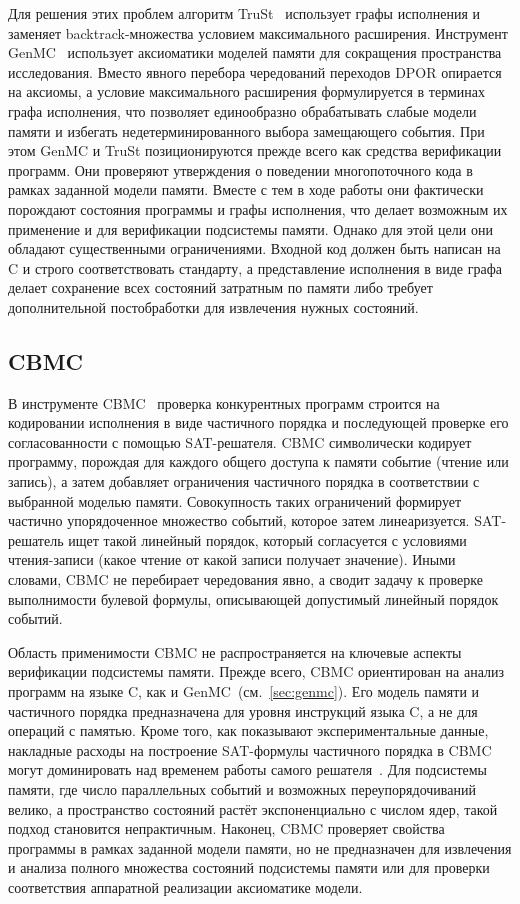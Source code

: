 Для решения этих проблем алгоритм
TruSt~\cite{kokologiannakis2022truly} использует графы исполнения и
заменяет backtrack-множества условием максимального расширения.
Инструмент GenMC~\cite{kokologiannakis2021genmc} использует
аксиоматики моделей памяти для сокращения пространства исследования.
Вместо явного перебора чередований переходов DPOR опирается на
аксиомы, а условие максимального расширения формулируется в терминах
графа исполнения, что позволяет единообразно обрабатывать слабые
модели памяти и избегать недетерминированного выбора замещающего события.
При этом GenMC и TruSt позиционируются прежде всего как средства
верификации программ. Они проверяют утверждения о поведении
многопоточного кода в рамках заданной модели памяти. Вместе с тем в
ходе работы они фактически порождают состояния программы и графы
исполнения, что делает возможным их применение и для верификации
подсистемы памяти. Однако для этой цели они обладают существенными
ограничениями. Входной код должен быть написан на C и строго
соответствовать стандарту, а представление исполнения в виде графа
делает сохранение всех состояний затратным по памяти либо требует
дополнительной постобработки для извлечения нужных состояний.

\subsection{CBMC}
\label{sec:cbmc}

В инструменте CBMC~\cite{alglave2013partial} проверка конкурентных
программ строится на
кодировании исполнения в виде частичного порядка и последующей
проверке его согласованности с помощью SAT-решателя. CBMC
символически кодирует программу, порождая для каждого
общего доступа к памяти событие (чтение или запись), а затем
добавляет ограничения частичного порядка в соответствии с выбранной
моделью памяти.
Совокупность таких ограничений формирует частично упорядоченное
множество событий,
которое затем линеаризуется. SAT-решатель ищет такой линейный порядок,
который согласуется с условиями чтения-записи
(какое чтение от какой записи получает значение). Иными словами,
CBMC не перебирает чередования явно, а сводит задачу к проверке
выполнимости булевой формулы, описывающей допустимый линейный порядок событий.

Область применимости CBMC не распространяется на ключевые аспекты
верификации подсистемы памяти.
Прежде всего, CBMC ориентирован на анализ программ на
языке C, как и GenMC~(см.~\ref{sec:genmc}). Его модель памяти и
частичного порядка
предназначена для уровня инструкций языка C, а не для операций с памятью.
Кроме того, как показывают экспериментальные данные, накладные расходы на
построение SAT-формулы частичного порядка в CBMC могут доминировать
над временем работы самого решателя~\cite{horn2015automated}.
Для подсистемы памяти, где число параллельных событий
и возможных переупорядочиваний велико, а пространство состояний
растёт экспоненциально с числом ядер, такой подход становится непрактичным.
Наконец, CBMC проверяет свойства
программы в рамках заданной модели памяти, но не предназначен для
извлечения и анализа полного множества состояний подсистемы памяти
или для проверки соответствия аппаратной реализации
аксиоматике модели.

